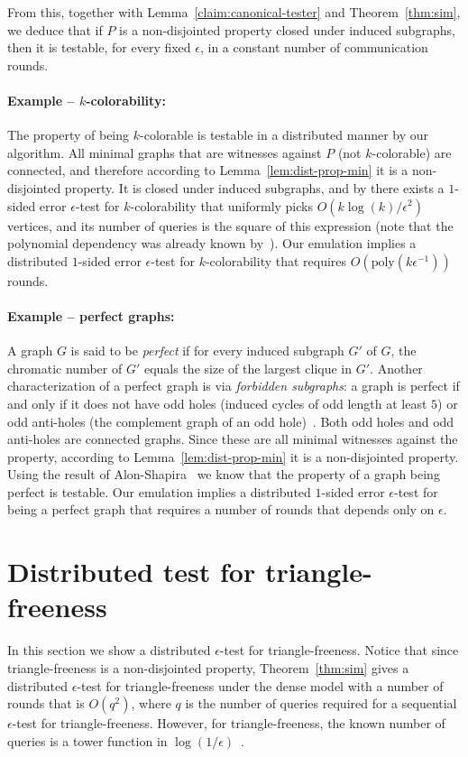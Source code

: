 \documentclass[11pt]{article}
\newcommand{\poly}{\textrm{poly}}
\begin{document}
 From this, together with Lemma~\ref{claim:canonical-tester} and Theorem~\ref{thm:sim}, we deduce that if $P$ is a non-disjointed property closed under induced subgraphs, then it is testable, for every fixed $\epsilon$, in a constant number of communication rounds.

	
\paragraph{Example -- $k$-colorability:} The property of being $k$-colorable is testable in a distributed manner by our algorithm. All minimal graphs that are witnesses against $P$ (not $k$-colorable) are connected, and therefore according to Lemma~\ref{lem:dist-prop-min} it is a non-disjointed property. It is closed under induced subgraphs, and by \cite{AlonK02} there exists a $1$-sided error $\epsilon$-test for $k$-colorability that uniformly picks $O(k\log(k)/\epsilon^2)$ vertices, and its number of queries is the square of this expression (note that the polynomial dependency was already known by~\cite{GGR98}). Our emulation implies a distributed $1$-sided error $\epsilon$-test for $k$-colorability that requires $O(\poly{(k\epsilon^{-1})})$ rounds.

	
\paragraph{Example -- perfect graphs:} A graph $G$ is said to be \emph{perfect} if for every induced subgraph $G'$ of $G$, the chromatic number of $G'$ equals the size of the largest clique in $G'$.
Another characterization of a perfect graph is via \emph{forbidden subgraphs}: a graph is perfect if and only if it does not have odd holes (induced cycles of odd length at least $5$) or odd anti-holes (the complement graph of an odd hole)~\cite{strong}. Both odd holes and odd anti-holes are connected graphs. Since these are all minimal witnesses against the property, according to Lemma~\ref{lem:dist-prop-min} it is a non-disjointed property.
Using the result of Alon-Shapira~\cite{AlonShapira} we know that the property of a graph being perfect is testable. Our emulation implies a distributed $1$-sided error $\epsilon$-test for being a perfect graph that requires a number of rounds that depends only on $\epsilon$.

\section{Distributed test for triangle-freeness}
\label{sec:triangle-freeness}
In this section we show a distributed $\epsilon$-test for triangle-freeness. Notice that since triangle-freeness is a non-disjointed property, Theorem~\ref{thm:sim} gives a distributed $\epsilon$-test for triangle-freeness under the dense model with a number of rounds that is $O(q^2)$, where $q$ is the number of queries required for a sequential $\epsilon$-test for triangle-freeness. However, for triangle-freeness, the known number of queries is a tower function in $\log(1/\epsilon)$~\cite{Fox2010}.
\end{document}
